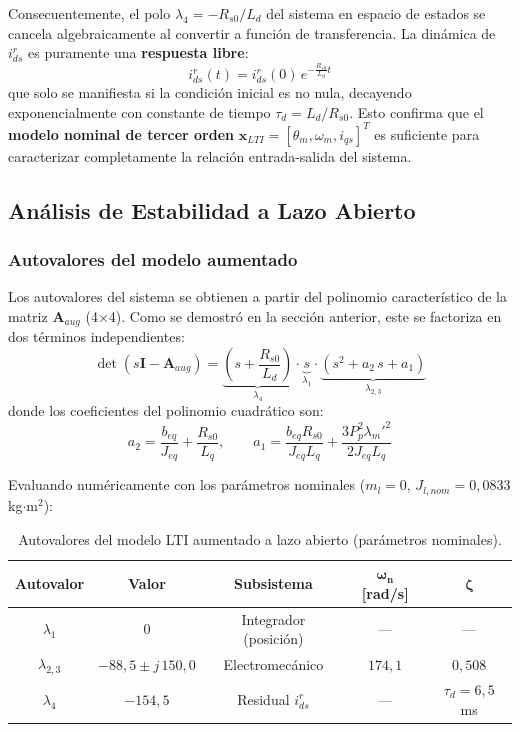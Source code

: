 \documentclass[12pt, a4paper,journal, onecolumn, compsoc]{IEEEtran}
\begin{document}
Consecuentemente, el polo $\lambda_4 = -R_{s0}/L_d$ del sistema en espacio de estados se cancela algebraicamente al convertir a función de transferencia. La dinámica de $i_{ds}^r$ es puramente una \textbf{respuesta libre}:
\begin{equation}
    i_{ds}^r(t) = i_{ds}^r(0) \, e^{-\frac{R_{s0}}{L_d} t}
\end{equation}
que solo se manifiesta si la condición inicial es no nula, decayendo exponencialmente con constante de tiempo $\tau_d = L_d / R_{s0}$. Esto confirma que el \textbf{modelo nominal de tercer orden} $\mathbf{x}_{LTI} = [\theta_m, \omega_m, i_{qs}]^T$ es suficiente para caracterizar completamente la relación entrada-salida del sistema.

\subsection{Análisis de Estabilidad a Lazo Abierto}

\subsubsection{Autovalores del modelo aumentado}
Los autovalores del sistema se obtienen a partir del polinomio característico de la matriz $\mathbf{A}_{aug}$ (4$\times$4). Como se demostró en la sección anterior, este se factoriza en dos términos independientes:
\begin{equation}
    \det(s\mathbf{I} - \mathbf{A}_{aug}) = \underbrace{\left(s + \frac{R_{s0}}{L_d}\right)}_{\lambda_4} \cdot \underbrace{s}_{\lambda_1} \cdot \underbrace{\left(s^2 + a_2\,s + a_1\right)}_{\lambda_{2,3}}
\end{equation}
donde los coeficientes del polinomio cuadrático son:
\begin{equation}
    a_2 = \frac{b_{eq}}{J_{eq}} + \frac{R_{s0}}{L_q}, \qquad a_1 = \frac{b_{eq} R_{s0}}{J_{eq} L_q} + \frac{3 P_p^2 \lambda_m'^2}{2 J_{eq} L_q}
\end{equation}

Evaluando numéricamente con los parámetros nominales ($m_l = 0$, $J_{l,nom} = 0{,}0833$ kg$\cdot$m$^2$):

\begin{table}[H]
\centering
\caption{Autovalores del modelo LTI aumentado a lazo abierto (parámetros nominales).}
\label{tab:autovalores_LA}
\renewcommand{\arraystretch}{1.4}
\begin{tabular}{|c|c|c|c|c|}
\hline
\textbf{Autovalor} & \textbf{Valor} & \textbf{Subsistema} & $\boldsymbol{\omega_n}$ \textbf{[rad/s]} & $\boldsymbol{\zeta}$ \\
\hline
$\lambda_1$ & $0$ & Integrador (posición) & --- & --- \\
\hline
$\lambda_{2,3}$ & $-88{,}5 \pm j\,150{,}0$ & Electromecánico & $174{,}1$ & $0{,}508$ \\
\hline
$\lambda_4$ & $-154{,}5$ & Residual $i_{ds}^r$ & --- & $\tau_d = 6{,}5$ ms \\
\hline
\end{tabular}
\end{table}
\end{document}
